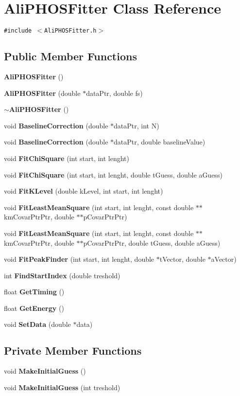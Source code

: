 \section{Ali\-PHOSFitter Class Reference}
\label{classAliPHOSFitter}
{\tt \#include $<$Ali\-PHOSFitter.h$>$}

\subsection*{Public Member Functions}
\begin{CompactItemize}
\item 
{\bf Ali\-PHOSFitter} ()
\item 
{\bf Ali\-PHOSFitter} (double $\ast$data\-Ptr, double fs)
\item 
{\bf $\sim$Ali\-PHOSFitter} ()
\item 
void {\bf Baseline\-Correction} (double $\ast$data\-Ptr, int N)
\item 
void {\bf Baseline\-Correction} (double $\ast$data\-Ptr, double baseline\-Value)
\item 
void {\bf Fit\-Chi\-Square} (int start, int lenght)
\item 
void {\bf Fit\-Chi\-Square} (int start, int lenght, double t\-Guess, double a\-Guess)
\item 
void {\bf Fit\-KLevel} (double k\-Level, int start, int lenght)
\item 
void {\bf Fit\-Least\-Mean\-Square} (int start, int lenght, const double $\ast$$\ast$km\-Covar\-Ptr\-Ptr, double $\ast$$\ast$p\-Covar\-Ptr\-Ptr)
\item 
void {\bf Fit\-Least\-Mean\-Square} (int start, int lenght, const double $\ast$$\ast$km\-Covar\-Ptr\-Ptr, double $\ast$$\ast$p\-Covar\-Ptr\-Ptr, double t\-Guess, double a\-Guess)
\item 
void {\bf Fit\-Peak\-Finder} (int start, int lenght, double $\ast$t\-Vector, double $\ast$a\-Vector)
\item 
int {\bf Find\-Start\-Index} (double treshold)
\item 
float {\bf Get\-Timing} ()
\item 
float {\bf Get\-Energy} ()
\item 
void {\bf Set\-Data} (double $\ast$data)
\end{CompactItemize}
\subsection*{Private Member Functions}
\begin{CompactItemize}
\item 
void {\bf Make\-Initial\-Guess} ()
\item 
void {\bf Make\-Initial\-Guess} (int treshold)
\end{CompactItemize}
